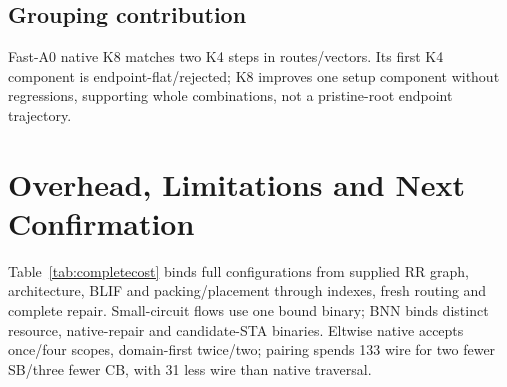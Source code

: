 \documentclass[conference,10pt]{IEEEtran}
\begin{document}
\subsection{Grouping contribution}
Fast-A0 native K8 matches two K4 steps in routes/vectors. Its first K4 component is endpoint-flat/rejected; K8 improves one setup component without regressions, supporting whole combinations, not a pristine-root endpoint trajectory.

\section{Overhead, Limitations and Next Confirmation}
Table~\ref{tab:completecost} binds full configurations from supplied RR graph, architecture, BLIF and packing/placement through indexes, fresh routing and complete repair. Small-circuit flows use one bound binary; BNN binds distinct resource, native-repair and candidate-STA binaries. Eltwise native accepts once/four scopes, domain-first twice/two; pairing spends 133 wire for two fewer SB/three fewer CB, with 31 less wire than native traversal.
\end{document}
